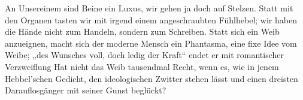 An Unsereinem sind Beine ein Luxus, wir gehen ja doch auf Stelzen. Statt mit den Organen tasten wir mit irgend einem angeschraubten Fühlhebel; wir haben die Hände nicht zum Handeln, sondern zum Schreiben. Statt sich ein Weib anzueignen, macht sich der moderne Mensch ein Phantasma, eine fixe Idee vom Weibe; „des Wunsches voll, doch ledig der Kraft“ endet er mit romantischer Verzweiflung  Hat nicht das Weib tausendmal Recht, wenn es, wie in jenem Hebbel’schen Gedicht, den ideologischen Zwitter stehen lässt und einen dreisten Darauflosgänger mit seiner Gunst beglückt?
\par

